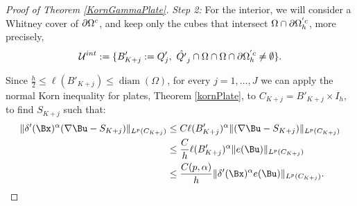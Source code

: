 \begin{proof}[Proof of Theorem \ref{KornGammaPlate}]
\textit{Step 2:} For the interior, we will consider a Whitney cover of $\partial\Omega^c$, and keep only the cubes that intersect $\Omega\cap\partial\Omega^{'c}_{h}$, more precisely, 
$$\mathcal{U}^{int}:= \{B'_{K+j}:=Q'_j,\ \hat{Q'}_j\cap\Omega\cap\Omega\cap\partial\Omega^{'c}_{h}\neq \emptyset \}.$$


Since $\frac{h}{2}\leq\ell(B'_{K+j})\leq \operatorname{diam}(\Omega)$, for every $j =1,\ldots,J$ we can apply the normal Korn inequality for plates, Theorem \ref{kornPlate}, to $C_{K+j}=B'_{K+j}\times I_h$, to find $S_{K+j}$ such that: 
\begin{align*}
    \|\delta'(\Bx)^\Ga(\nabla \Bu -S_{K+j})\|_{L^p(C_{K+j})}&\leq C\ell(B'_{K+j})^\alpha\|(\nabla \Bu -S_{K+j})\|_{L^p(C_{K+j})}\\
    &\leq\frac{C}{h}\ell(B'_{K+j})^{\alpha}\| e(\Bu)\|_{L^p(C_{K+j})}\\
    &\leq \frac{C(p,\alpha)}{h}\|\delta'(\Bx)^\Ga e(\Bu)\|_{L^p(C_{K+j})}.
\end{align*}




\end{proof}
